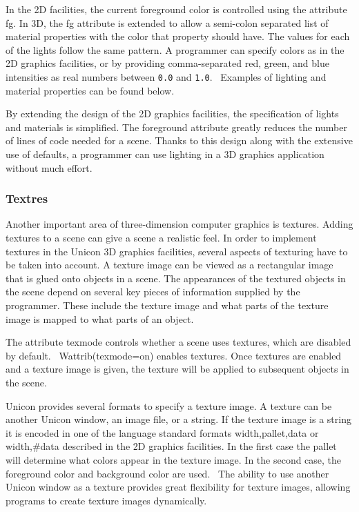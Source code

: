 In the 2D facilities, the current foreground color is controlled using
the attribute fg. In 3D, the fg attribute is extended to allow a
semi-colon separated list of material properties with the color that
property should have. The values for each of the lights follow the same
pattern. A programmer can specify colors as in the 2D graphics
facilities, or by providing comma-separated red, green, and blue
intensities as real numbers between \texttt{0.0} and \texttt{1.0}.
\ Examples of lighting and material properties can be found below.

By extending the design of the 2D graphics facilities, the specification
of lights and materials is simplified. The foreground attribute greatly
reduces the number of lines of code needed for a scene. Thanks to this
design along with the extensive use of defaults, a programmer can use
lighting in a 3D graphics application without much effort.

\subsubsection[Textures]{Textres}
Another important area of three-dimension computer graphics is textures.
Adding textures to a scene can give a scene a realistic feel. In order
to implement textures in the Unicon 3D graphics facilities, several
aspects of texturing have to be taken into account. A texture image can
be viewed as a rectangular image that is
{\textquotedbl}glued{\textquotedbl} onto objects in a scene. The
appearances of the textured objects in the scene depend on several key
pieces of information supplied by the programmer. These include the
texture image and what parts of the texture image is mapped to what
parts of an object.

The attribute texmode controls whether a scene uses textures, which are
disabled by default.
\ Wattrib({\textquotedbl}texmode=on{\textquotedbl}) enables textures.
Once textures are enabled and a texture image is given, the texture
will be applied to subsequent objects in the scene. 

Unicon provides several formats to specify a texture image. A texture
can be another Unicon window, an image file, or a string. If the
texture image is a string it is encoded in one of the language standard
formats {\textquotedbl}width,pallet,data{\textquotedbl} or
{\textquotedbl}width,\#data{\textquotedbl} described in the 2D graphics
facilities. In the first case the pallet will determine what colors
appear in the texture image. In the second case, the foreground color
and background color are used. \ The ability to use another Unicon
window as a texture provides great flexibility for texture images,
allowing programs to create texture images dynamically.

